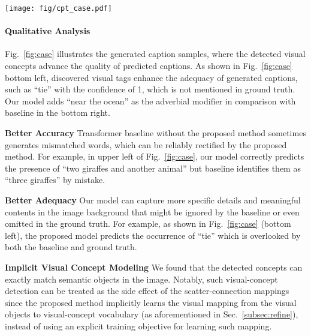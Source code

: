 \documentclass[11pt]{article}
\begin{document}
\begin{figure*}[thb]
\begin{center}
\texttt{[image: fig/cpt\_case.pdf]}
\vskip -3mm
\caption{Detected tags and generated captions using baseline (Transformer) and proposed models on MS-COCO, where red and green backgrounds indicate wrong and correct predictions respectively. The value in brackets means the confidence (\emph{i.e.}, probability) of corresponding tags in the image.
}
\label{fig:case}
\end{center}
\vskip -5mm
\end{figure*}

\paragraph{Qualitative Analysis}
Fig.~\ref{fig:case} illustrates the generated caption samples, where the detected visual concepts advance the quality of predicted captions. As shown in Fig.~\ref{fig:case} bottom left, discovered visual tags enhance the adequacy of generated captions, such as ``tie'' with the confidence of 1, which is not mentioned in ground truth. Our model adds ``near the ocean'' as the adverbial modifier in comparison with baseline in the bottom right. 

{\bf Better Accuracy} Transformer baseline without the proposed method sometimes generates mismatched words, which can be reliably rectified by the proposed method. For example, in upper left of Fig.~\ref{fig:case}, our model correctly predicts the presence of ``two giraffes and another animal'' but baseline identifies them as ``three giraffes'' by mistake.

{\bf Better Adequacy} Our model can capture more specific details and meaningful contents in the image background that might be ignored by the baseline or even omitted in the ground truth. For example, as shown in Fig.~\ref{fig:case} (bottom left), the proposed model predicts the occurrence of ``tie'' which is overlooked by both the baseline and ground truth.

{\bf Implicit Visual Concept Modeling} We found that the detected concepts can exactly match semantic objects in the image. Notably, such visual-concept detection can be treated as the side effect of the scatter-connection mappings since the proposed method implicitly learns the visual mapping from the visual objects to visual-concept vocabulary (as aforementioned in Sec.~\ref{subsec:refine}), instead of using an explicit training objective for learning such mapping.
\end{document}

